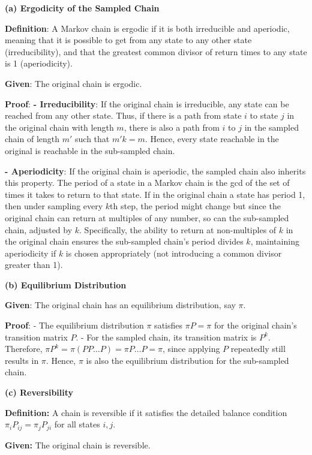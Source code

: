 \documentclass[8pt]{article}
\begin{document}
\textbf{(a) Ergodicity of the Sampled Chain}

\textbf{Definition}: A Markov chain is ergodic if it is both irreducible and aperiodic, meaning that it is possible to get from any state to any other state (irreducibility), and that the greatest common divisor of return times to any state is 1 (aperiodicity).

\textbf{Given}: The original chain is ergodic.

\textbf{Proof}:
\textbf{- Irreducibility}: If the original chain is irreducible, any state can be reached from any other state. Thus, if there is a path from state \(i\) to state \(j\) in the original chain with length \(m\), there is also a path from \(i\) to \(j\) in the sampled chain of length \(m'\) such that \(m'k = m\). Hence, every state reachable in the original is reachable in the sub-sampled chain.
  
\textbf{- Aperiodicity}: If the original chain is aperiodic, the sampled chain also inherits this property. The period of a state in a Markov chain is the gcd of the set of times it takes to return to that state. If in the original chain a state has period 1, then under sampling every \(k\)th step, the period might change but since the original chain can return at multiples of any number, so can the sub-sampled chain, adjusted by \(k\). Specifically, the ability to return at non-multiples of \(k\) in the original chain ensures the sub-sampled chain's period divides \(k\), maintaining aperiodicity if \(k\) is chosen appropriately (not introducing a common divisor greater than 1).

\textbf{(b) Equilibrium Distribution}

\textbf{Given}: The original chain has an equilibrium distribution, say \(\pi\).

\textbf{Proof}:
- The equilibrium distribution \(\pi\) satisfies \(\pi P = \pi\) for the original chain's transition matrix \(P\).
- For the sampled chain, its transition matrix is \(P^k\). Therefore, \(\pi P^k = \pi (P P \ldots P) = \pi P \ldots P = \pi\), since applying \(P\) repeatedly still results in \(\pi\). Hence, \(\pi\) is also the equilibrium distribution for the sub-sampled chain.

\textbf{(c) Reversibility}

\textbf{Definition:} A chain is reversible if it satisfies the detailed balance condition \(\pi_i P_{ij} = \pi_j P_{ji}\) for all states \(i, j\).

\textbf{Given:} The original chain is reversible.
\end{document}
